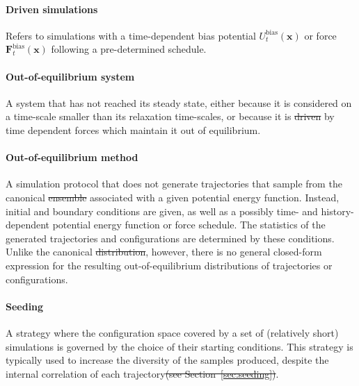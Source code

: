\documentclass[9pt,review]{livecoms}
\newcommand{\vx}{\mathbf{x}}
\newcommand{\vF}{\mathbf{F}}
\providecommand{\DIFaddtex}[1]{{\protect\color{blue}\uwave{#1}}} %
\providecommand{\DIFdeltex}[1]{{\protect\color{red}\sout{#1}}}                      %
\providecommand{\DIFaddbegin}{} %
\providecommand{\DIFaddend}{} %
\providecommand{\DIFdelbegin}{} %
\providecommand{\DIFdelend}{} %
\providecommand{\DIFadd}[1]{\texorpdfstring{\DIFaddtex{#1}}{#1}} %
\providecommand{\DIFdel}[1]{\texorpdfstring{\DIFdeltex{#1}}{}} %
\newcommand{\DIFscaledelfig}{0.5}
\newlength{\DIFdelgraphicswidth} %
\newlength{\DIFdelgraphicsheight} %
\newcommand{\DIFaddincludegraphics}[2][]{{\color{blue}\fbox{\DIFOincludegraphics[#1]{#2}}}} %
\newcommand{\DIFdelincludegraphics}[2][]{%
\sbox{\DIFdelgraphicsbox}{\DIFOincludegraphics[#1]{#2}}%
\settoboxwidth{\DIFdelgraphicswidth}{\DIFdelgraphicsbox} %
\settoboxtotalheight{\DIFdelgraphicsheight}{\DIFdelgraphicsbox} %
\scalebox{\DIFscaledelfig}{%
\parbox[b]{\DIFdelgraphicswidth}{\usebox{\DIFdelgraphicsbox}\\[-\baselineskip] \rule{\DIFdelgraphicswidth}{0em}}\llap{\resizebox{\DIFdelgraphicswidth}{\DIFdelgraphicsheight}{%
\setlength{\unitlength}{\DIFdelgraphicswidth}%
\begin{picture}(1,1)%
\thicklines\linethickness{2pt} %
{\color[rgb]{1,0,0}\put(0,0){\framebox(1,1){}}}%
{\color[rgb]{1,0,0}\put(0,0){\line( 1,1){1}}}%
{\color[rgb]{1,0,0}\put(0,1){\line(1,-1){1}}}%
\end{picture}%
}\hspace*{3pt}}} %
} %
\DeclareRobustCommand{\DIFaddbegin}{\DIFOaddbegin \let\includegraphics\DIFaddincludegraphics} %
\DeclareRobustCommand{\DIFaddend}{\DIFOaddend \let\includegraphics\DIFOincludegraphics} %
\DeclareRobustCommand{\DIFdelbegin}{\DIFOdelbegin \let\includegraphics\DIFdelincludegraphics} %
\DeclareRobustCommand{\DIFdelend}{\DIFOaddend \let\includegraphics\DIFOincludegraphics} %
\begin{document}
\hypertarget{ref:Driven} {\paragraph{Driven simulations}} Refers to simulations with a time-dependent bias potential $U^{\mathrm{bias}}_t(\vx)$ or force $\vF^\mathrm{bias}_t(\vx)$ following a pre-determined schedule.

\paragraph{Out-of-equilibrium system} A system that has not reached its steady state, either because it is considered on a time-scale smaller than its relaxation time-scales, or because it is \DIFdelbegin %
\DIFdel{driven }%
\DIFdelend \DIFaddbegin \DIFadd{driven }\DIFaddend by time dependent forces which maintain it out of equilibrium.

\hypertarget{ref:OutOfEq} {\paragraph{Out-of-equilibrium method}}
A simulation protocol that does not generate trajectories that sample from the canonical \DIFdelbegin \DIFdel{ensemble }\DIFdelend \DIFaddbegin \hyperlink{ref:Ensemble} {\DIFadd{ensemble}} \DIFaddend associated with a given potential energy function.
Instead, initial and boundary conditions are given, as well as a possibly time- and history-dependent potential energy function or force schedule. The statistics of the generated trajectories and configurations are determined by these conditions.
Unlike the canonical \DIFdelbegin \DIFdel{distribution}\DIFdelend \DIFaddbegin \hyperlink{ref:Distribution} {\DIFadd{distribution}}\DIFaddend , however, there is no general closed-form expression for the resulting out-of-equilibrium distributions of trajectories or configurations.

\hypertarget{ref:Seeding} {\paragraph{Seeding}}
A strategy where the configuration space covered by a set of (relatively short) simulations is governed by the choice of their starting conditions. This strategy is typically used to increase the diversity of the samples produced, despite the internal correlation of each trajectory\DIFdelbegin \DIFdel{(see Section~\ref{sec:seeding})}\DIFdelend .
\end{document}
